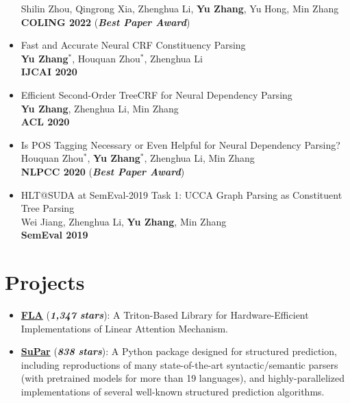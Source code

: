 \documentclass[a4paper,12pt]{article}
\begin{document}
\begin{itemize}[leftmargin=18pt]
            Shilin Zhou, Qingrong Xia, Zhenghua Li, \textbf{Yu Zhang}, Yu Hong, Min Zhang\\
            \textbf{COLING 2022} (\textbf{\emph{\textcolor{brickred}{Best Paper Award}}})
      \item Fast and Accurate Neural CRF Constituency Parsing\\
            \textbf{Yu Zhang$^*$}, Houquan Zhou$^*$, Zhenghua Li\\
            \textbf{IJCAI 2020}
      \item Efficient Second-Order TreeCRF for Neural Dependency Parsing\\
            \textbf{Yu Zhang}, Zhenghua Li, Min Zhang\\
            \textbf{ACL 2020}
      \item Is POS Tagging Necessary or Even Helpful for Neural Dependency Parsing?\\
            Houquan Zhou$^*$, \textbf{Yu Zhang$^*$}, Zhenghua Li, Min Zhang\\
            \textbf{NLPCC 2020} (\textbf{\emph{\textcolor{brickred}{Best Paper Award}}})
      \item HLT@SUDA at SemEval-2019 Task 1: UCCA Graph Parsing as Constituent Tree Parsing\\
            Wei Jiang, Zhenghua Li, \textbf{Yu Zhang}, Min Zhang\\
            \textbf{SemEval 2019}
\end{itemize}

\section{Projects}
\begin{itemize}[leftmargin=18pt]
      \item \href{https://github.com/sustcsonglin/flash-linear-attention}{\textbf{FLA}} (\textbf{\emph{\textcolor{brickred}{1,347 stars}}}): A Triton-Based Library for Hardware-Efficient Implementations of Linear Attention Mechanism.
      \item \href{https://github.com/yzhangcs/parser}{\textbf{SuPar}} (\textbf{\emph{\textcolor{brickred}{838 stars}}}): A Python package designed for structured prediction, including reproductions of many state-of-the-art syntactic/semantic parsers (with pretrained models for more than 19 languages), and highly-parallelized implementations of several well-known structured prediction algorithms.
\end{itemize}
\end{document}
